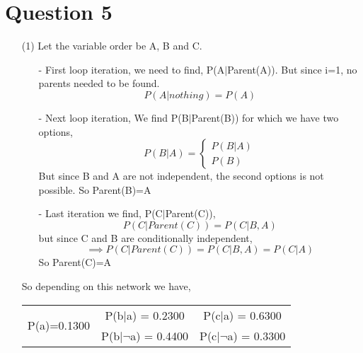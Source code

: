 \documentclass[letter, 11pt]{article}
\begin{document}
\section*{Question 5}
\setcounter{equation}{0}
\begin{itemize}
    \item[(1)] Let the variable order be A, B and C.\\
    \begin{itemize}
        \item[-] First loop iteration, we need to find, P(A$|$Parent(A)). But since i=1, no parents needed to be found.
                \begin{equation*}
                    P(A|nothing) = P(A)
                \end{equation*}
        \item[-] Next loop iteration, We find P(B$|$Parent(B)) for which we have two options,
                \begin{equation*}
                    P(B|A) = \begin{cases}
                                P(B|A)\\
                                P(B)
                            \end{cases}
                \end{equation*}
                But since B and A are not independent, the second options is not possible. So Parent(B)=A
        \item[-] Last iteration we find, P(C$|$Parent(C)),
                \begin{equation*}
                    P(C|Parent(C)) = P(C|B,A) 
                \end{equation*}
                but since C and B are conditionally independent,
                \begin{equation*}
                    \implies P(C|Parent(C)) = P(C|B,A) = P(C|A)
                \end{equation*}
                So Parent(C)=A
    \end{itemize}
    So depending on this network we have,\\
    \begin{tabular}{ |c|c|c| } 
        \hline
        \multirow{2}{*}{P(a)=0.1300} & P(b$|$a) = 0.2300 & P(c$|$a) = 0.6300 \\\cline{2-3}
        & P(b$|\neg$a) = 0.4400 & P(c$|\neg$a) = 0.3300 \\\cline{3-3}
        \hline
    \end{tabular}
    \begin{tikzpicture}[baseline={(current bounding box.east)},->,>=stealth',shorten >=1pt,auto,node distance=3cm,thick,main node/.style={circle,draw,font=\sffamily\Large\bfseries}]


\end{tikzpicture}
\end{itemize}
\end{document}
